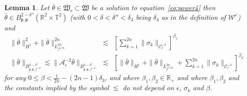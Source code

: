 \documentclass[a4paper,10pt]{article}
\newtheorem{lemma}[theorem]{Lemma}
\begin{document}
\begin{lemma}
  \label{lemma_power1}Let $\bar{\theta} \in \overline{\mathfrak{W}}_{\epsilon}
  \subset \overline{\mathfrak{W}}$ be a solution to
  equation~{\eqref{eq:power4}} then $\bar{\theta} \in B^{2 -
  \delta''}_{\mathfrak{p}, \mathfrak{p}} (\mathbb{R}^2 \times \mathbb{T}^2)$
  (with $0 < \delta < \delta'' < \delta_4$ being $\delta_4$ as in the
  definition of $\mathcal{W}^e$) and
  \begin{eqnarray}
    \| \bar{\theta} \|_{H^1}^2 + \| \bar{\theta} \|_{L^{2 n}_{f^{1 / 2 n}}}^{2
    n} & \lesssim & \left[ \sum_{k = 1}^{2 n} \| \sigma_k \|_{\mathcal{C}^{-
    \delta}_{\ell}} \right]^{\beta_1}  \label{eq:P1}\\
    \| \bar{\theta} \|_{B^{2 - \delta''}_{\mathfrak{p}, \mathfrak{p}, f^{-
    \beta}}} \lesssim \| \mathcal{A}_{\epsilon}^{- 2} \bar{\theta} \|_{B^{2 -
    \delta''}_{\mathfrak{p}, \mathfrak{p}, f^{- \beta}}} & \lesssim & \left[
    \| \bar{\theta} \|_{H^1} + \| \bar{\theta} \|_{L^{2 n}_{f^{1 / 2 n}}} +
    \sum_{k = 1}^{2 n} \| \sigma_k \|_{\mathcal{C}^{- \delta}_{\ell}}
    \right]^{\beta_2}  \label{eq:P2}
  \end{eqnarray}
  for any $0 \leqslant \beta < \frac{1}{2 n} - (2 n - 1) \delta_3$, and where
  $\beta_1, \beta_2 \in \mathbb{R}_+$ and where $\beta_1, \beta_2$ and the
  constants implied by the symbol $\lesssim$ do not depend on $\epsilon$,
  $\sigma_k$ and $\beta$.
\end{lemma}
\end{document}
